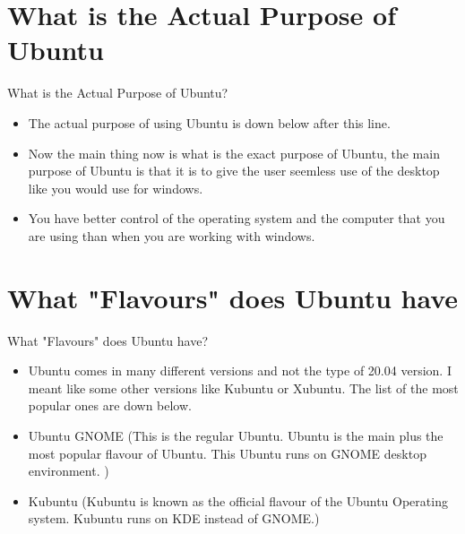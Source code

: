 \documentclass[aspectratio=43]{beamer}
\begin{document}
\section{What is the Actual Purpose of Ubuntu}
\begin{frame}{What is the Actual Purpose of Ubuntu?}
	\begin{itemize}
		\item The actual purpose of using Ubuntu is down below after this line.
		\item Now the main thing now is what is the exact purpose of Ubuntu, the 		main purpose of Ubuntu is that it is to give the user seemless use of the desktop 		like you would use for windows.
	\item You have better control of the operating system and the computer that you are using than when you are working with windows.
	\end{itemize}
\end{frame}



	\section{What "Flavours" does Ubuntu have }
	\begin{frame}{What "Flavours" does Ubuntu have?}
	\begin{block}{}
	\begin{itemize}
	\item Ubuntu comes in many different versions and not the type of 20.04 version. I meant like some other versions like Kubuntu or Xubuntu. The list of the most popular ones are down below.
	\item Ubuntu GNOME (This is the regular Ubuntu. Ubuntu is the main plus the most popular flavour of Ubuntu. This Ubuntu runs on GNOME desktop environment. )
	\item Kubuntu (Kubuntu is known as the official flavour of the Ubuntu Operating system. Kubuntu runs on KDE instead of GNOME.)
	\end{itemize}
	\end{block}
	\end{frame}
	
\end{document}

